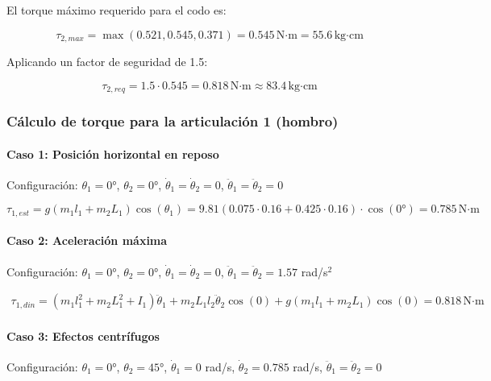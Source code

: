 El torque máximo requerido para el codo es:

\begin{equation}
\tau_{2,max} = \max(0.521, 0.545, 0.371) = 0.545 \, \text{N·m} = 55.6 \, \text{kg·cm}
\end{equation}

Aplicando un factor de seguridad de 1.5:

\begin{equation}
\tau_{2,req} = 1.5 \cdot 0.545 = 0.818 \, \text{N·m} \approx 83.4 \, \text{kg·cm}
\end{equation}

\subsubsection{Cálculo de torque para la articulación 1 (hombro)}

\paragraph{Caso 1: Posición horizontal en reposo}

Configuración: $\theta_1 = 0°$, $\theta_2 = 0°$, $\dot{\theta}_1 = \dot{\theta}_2 = 0$, $\ddot{\theta}_1 = \ddot{\theta}_2 = 0$

\begin{equation}
\tau_{1,est} = g(m_1l_1 + m_2L_1)\cos(\theta_1)
= 9.81(0.075 \cdot 0.16 + 0.425 \cdot 0.16) \cdot \cos(0°)
= 0.785 \, \text{N·m}
\end{equation}

\paragraph{Caso 2: Aceleración máxima}

Configuración: $\theta_1 = 0°$, $\theta_2 = 0°$, $\dot{\theta}_1 = \dot{\theta}_2 = 0$, $\ddot{\theta}_1 = \ddot{\theta}_2 = 1.57$ rad/s$^2$

\begin{multline}
\tau_{1,din} = (m_1l_1^2 + m_2L_1^2 + I_1)\ddot{\theta}_1 + m_2L_1l_2\ddot{\theta}_2\cos(0) + g(m_1l_1 + m_2L_1)\cos(0) = 0.818 \, \text{N·m}
\end{multline}

\paragraph{Caso 3: Efectos centrífugos}

Configuración: $\theta_1 = 0°$, $\theta_2 = 45°$, $\dot{\theta}_1 = 0$ rad/s, $\dot{\theta}_2 = 0.785$ rad/s, $\ddot{\theta}_1 = \ddot{\theta}_2 = 0$

